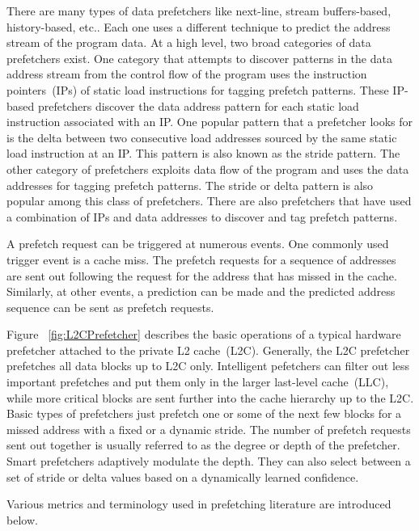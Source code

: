 There are many types of data prefetchers like next-line, stream buffers-based, history-based, etc.. Each one uses a different technique to predict the address stream of the program data. At a high level, two broad categories of data prefetchers exist. One category that attempts to discover patterns in the data address stream from the control flow of the program uses the instruction pointers~(IPs) of static load instructions for tagging prefetch patterns. These IP-based prefetchers discover the data address pattern for each static load instruction associated with an IP. One popular pattern that a prefetcher looks for is the delta between two consecutive load addresses sourced by the same static load instruction at an IP. This pattern is also known as the stride pattern. The other category of prefetchers exploits data flow of the program and uses the data addresses for tagging prefetch patterns. The stride or delta pattern is also popular among this class of prefetchers. There are also prefetchers that have used a combination of IPs and data addresses to discover and tag prefetch patterns.

A prefetch request can be triggered at numerous events. One commonly used trigger event is a cache miss. The prefetch requests for a sequence of addresses are sent out following the request for the address that has missed in the cache. Similarly, at other events, a prediction can be made and the predicted address sequence can be sent as prefetch requests.

Figure ~\ref{fig:L2CPrefetcher} describes the basic operations of a typical hardware prefetcher attached to the private L2 cache~(L2C). Generally, the L2C prefetcher prefetches all data blocks up to L2C only. Intelligent pefetchers can filter out less important  prefetches and put them only in the larger last-level cache~(LLC), while more critical blocks are sent further into the cache hierarchy up to the L2C.
Basic types of prefetchers just prefetch one or some of the next few blocks for a missed address with a fixed or a dynamic stride. The number of prefetch requests sent out together is usually referred to as the degree or depth of the prefetcher. Smart prefetchers adaptively modulate the depth. They can also select between a set of stride or delta values based on a dynamically learned confidence.

Various metrics and terminology used in prefetching literature are introduced below.

